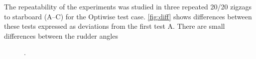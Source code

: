 \noindent The repeatability of the experiments was studied in three repeated 20/20 zigzags to starboard (A--C) for the Optiwise test case. \autoref{fig:diff} shows differences between these tests expressed as deviations from the first test A. There are small differences between the rudder angles   
\begin{figure}[h!]
    \centering   
    
    \caption{.}
    \label{fig:diff}
\end{figure}
%    
%
%    
